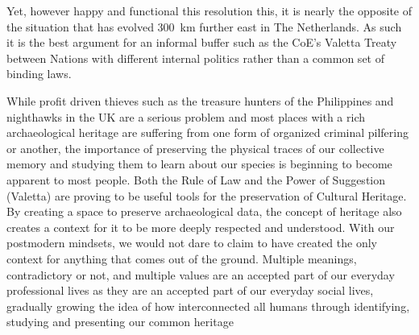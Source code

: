Yet, however happy and functional this resolution this, it is nearly the opposite of the situation that has evolved \SI{300}{\kilo\metre} further east in The Netherlands. 
As such it is the best argument for an informal buffer such as the CoE’s Valetta Treaty between Nations with different internal politics rather than a common set of binding laws. 

While profit driven thieves such as the treasure hunters of the Philippines and nighthawks in the UK are a serious problem and most places with a rich archaeological heritage are suffering from one form of organized criminal pilfering or another, the importance of preserving the physical traces of our collective memory and studying them to learn about our species is beginning to become apparent to most people. Both the Rule of Law \parencite{RA10066} and the Power of Suggestion (Valetta) are proving to be useful tools for the preservation of Cultural Heritage. By creating a space to preserve archaeological data, the concept of heritage also creates a context for it to be more deeply respected and understood. With our postmodern mindsets, we would not dare to claim to have created the only context for anything that comes out of the ground. Multiple meanings, contradictory or not, and multiple values are an accepted part of our everyday professional lives as they are an accepted part of our everyday social lives, gradually growing the idea of how interconnected all humans through identifying, studying and presenting our common heritage






\IJSRAclosing
%